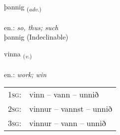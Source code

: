 \documentclass[frontgrid, backgrid]{flacards}\usepackage[]{graphicx}\usepackage[]{xcolor}
\begin{document}

\renewcommand{\flhead}{\vskip5pt \fboxsep=0pt {\small\bfseries\footnotesize Atviksorð | Adverb}}
\renewcommand{\fcfoot}{\vskip5pt \fboxsep=0pt \hspace{2pt}{\small\bfseries\footnotesize 1K}}

\renewcommand{\blhead}{\vskip5pt {\small\bfseries\footnotesize Atviksorð | Adverb }}
\renewcommand{\bcfoot}{\vskip5pt \hspace{2pt}{\small\bfseries\footnotesize 1K}}


{þannig \small{\textsubscript{(\textit{adv.})}} \\[1ex]
\textphonetic{[θanɪɣ]} \\
en.: \emph{so, thus; such} \\  [2ex]
þannig (Indeclinable)}

\renewcommand{\flhead}{\vskip5pt \fboxsep=0pt {\small\bfseries\footnotesize Sagnorð | Verb}}
\renewcommand{\fcfoot}{\vskip5pt \fboxsep=0pt \hspace{2pt}{\small\bfseries\footnotesize 1K}}

\renewcommand{\blhead}{\vskip5pt {\small\bfseries\footnotesize Sagnorð | Verb }}
\renewcommand{\bcfoot}{\vskip5pt \hspace{2pt}{\small\bfseries\footnotesize 1K}}


{vinna \small{\textsubscript{(\textit{v.})}} \\[1ex] %
\textphonetic{[vɪna]} \\
en.: \emph{work; win} \\  [2ex]
\renewcommand*{\arraystretch}{0.8}
\begin{tabular}{p{1cm}l}
\textsc{1sg}: & vinn -- vann -- unnið \\ 
\textsc{2sg}: & vinnur -- vannst -- unnið \\ 
\textsc{3sg}: & vinnur -- vann -- unnið \\ 
\end{tabular}
}

\end{document}
